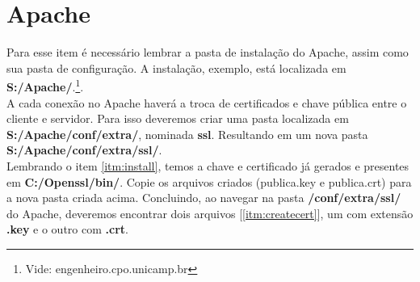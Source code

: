 \documentclass[a4paper,10pt]{article}
\begin{document}
\section{Apache}
Para esse item é necessário lembrar a pasta de instalação do Apache, assim como sua pasta de configuração. A instalação, exemplo, está localizada em \textbf{S:/Apache/}.\footnote{Vide: engenheiro.cpo.unicamp.br}.\\
A cada conexão no Apache haverá a troca de certificados e chave pública entre o cliente e servidor. Para isso deveremos criar uma pasta localizada em \textbf{S:/Apache/conf/extra/}, nominada \textbf{ssl}. Resultando em um nova pasta \textbf{S:/Apache/conf/extra/ssl/}.\\
Lembrando o item \ref{itm:install}, temos a chave e certificado já gerados e presentes em \textbf{C:/Openssl/bin/}. Copie os arquivos criados (publica.key e publica.crt) para a nova pasta criada acima. Concluindo, ao navegar na pasta \textbf{/conf/extra/ssl/} do Apache, deveremos encontrar dois arquivos [\ref{itm:createcert}], um com extensão \textbf{.key} e o outro com \textbf{.crt}.
\end{document}
